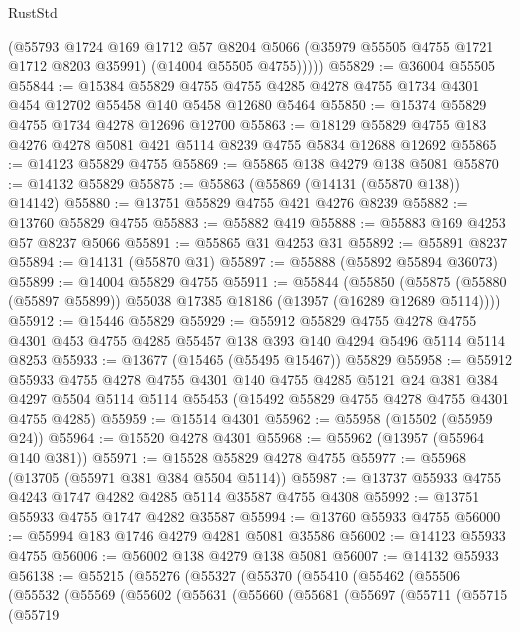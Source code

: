 \begin{lexlean}{RustStd}
\begin{coremodule}
          (@55793
            @1724
            @169
            @1712
            @57
            @8204
            @5066
            (@35979 @55505 @4755 @1721 @1712 @8203 @35991)
            (@14004 @55505 @4755)))))
@55829 := @36004 @55505
@55844 := @15384
    @55829
    @4755
    @4755
    @4285
    @4278
    @4755
    @1734
    @4301
    @454
    @12702
    @55458
    @140
    @5458
    @12680
    @5464
@55850 := @15374 @55829 @4755 @1734 @4278 @12696 @12700
@55863 := @18129 @55829 @4755 @183 @4276 @4278 @5081 @421 @5114 @8239 @4755 @5834 @12688 @12692
@55865 := @14123 @55829 @4755
@55869 := @55865 @138 @4279 @138 @5081
@55870 := @14132 @55829
@55875 := @55863 (@55869 (@14131 (@55870 @138)) @14142)
@55880 := @13751 @55829 @4755 @421 @4276 @8239
@55882 := @13760 @55829 @4755
@55883 := @55882 @419
@55888 := @55883 @169 @4253 @57 @8237 @5066
@55891 := @55865 @31 @4253 @31
@55892 := @55891 @8237
@55894 := @14131 (@55870 @31)
@55897 := @55888 (@55892 @55894 @36073)
@55899 := @14004 @55829 @4755
@55911 := @55844
    (@55850 (@55875 (@55880 (@55897 @55899)) @55038 @17385 @18186 (@13957 (@16289 @12689 @5114))))
@55912 := @15446 @55829
@55929 := @55912
    @55829
    @4755
    @4278
    @4755
    @4301
    @453
    @4755
    @4285
    @55457
    @138
    @393
    @140
    @4294
    @5496
    @5114
    @5114
    @8253
@55933 := @13677 (@15465 (@55495 @15467)) @55829
@55958 := @55912
    @55933
    @4755
    @4278
    @4755
    @4301
    @140
    @4755
    @4285
    @5121
    @24
    @381
    @384
    @4297
    @5504
    @5114
    @5114
    @55453
    (@15492 @55829 @4755 @4278 @4755 @4301 @4755 @4285)
@55959 := @15514 @4301
@55962 := @55958 (@15502 (@55959 @24))
@55964 := @15520 @4278 @4301
@55968 := @55962 (@13957 (@55964 @140 @381))
@55971 := @15528 @55829 @4278 @4755
@55977 := @55968 (@13705 (@55971 @381 @384 @5504 @5114))
@55987 := @13737 @55933 @4755 @4243 @1747 @4282 @4285 @5114 @35587 @4755 @4308
@55992 := @13751 @55933 @4755 @1747 @4282 @35587
@55994 := @13760 @55933 @4755
@56000 := @55994 @183 @1746 @4279 @4281 @5081 @35586
@56002 := @14123 @55933 @4755
@56006 := @56002 @138 @4279 @138 @5081
@56007 := @14132 @55933
@56138 := @55215
    (@55276
      (@55327
        (@55370
          (@55410
            (@55462
              (@55506
                (@55532
                  (@55569
                    (@55602
                      (@55631
                        (@55660
                          (@55681
                            (@55697
                              (@55711
                                (@55715
                                  (@55719

\end{coremodule}
\end{lexlean}

